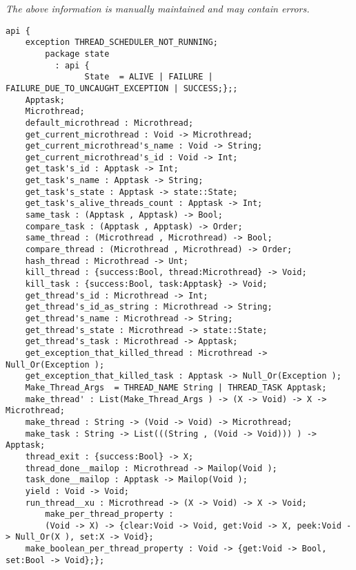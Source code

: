 \label{api:Microthread}

{\tiny \it The above information is manually maintained and may contain errors.}
\begin{verbatim}
api {
    exception THREAD_SCHEDULER_NOT_RUNNING;
        package state
          : api {
                State  = ALIVE | FAILURE | FAILURE_DUE_TO_UNCAUGHT_EXCEPTION | SUCCESS;};;
    Apptask;
    Microthread;
    default_microthread : Microthread;
    get_current_microthread : Void -> Microthread;
    get_current_microthread's_name : Void -> String;
    get_current_microthread's_id : Void -> Int;
    get_task's_id : Apptask -> Int;
    get_task's_name : Apptask -> String;
    get_task's_state : Apptask -> state::State;
    get_task's_alive_threads_count : Apptask -> Int;
    same_task : (Apptask , Apptask) -> Bool;
    compare_task : (Apptask , Apptask) -> Order;
    same_thread : (Microthread , Microthread) -> Bool;
    compare_thread : (Microthread , Microthread) -> Order;
    hash_thread : Microthread -> Unt;
    kill_thread : {success:Bool, thread:Microthread} -> Void;
    kill_task : {success:Bool, task:Apptask} -> Void;
    get_thread's_id : Microthread -> Int;
    get_thread's_id_as_string : Microthread -> String;
    get_thread's_name : Microthread -> String;
    get_thread's_state : Microthread -> state::State;
    get_thread's_task : Microthread -> Apptask;
    get_exception_that_killed_thread : Microthread -> Null_Or(Exception );
    get_exception_that_killed_task : Apptask -> Null_Or(Exception );
    Make_Thread_Args  = THREAD_NAME String | THREAD_TASK Apptask;
    make_thread' : List(Make_Thread_Args ) -> (X -> Void) -> X -> Microthread;
    make_thread : String -> (Void -> Void) -> Microthread;
    make_task : String -> List(((String , (Void -> Void))) ) -> Apptask;
    thread_exit : {success:Bool} -> X;
    thread_done__mailop : Microthread -> Mailop(Void );
    task_done__mailop : Apptask -> Mailop(Void );
    yield : Void -> Void;
    run_thread__xu : Microthread -> (X -> Void) -> X -> Void;
        make_per_thread_property :
        (Void -> X) -> {clear:Void -> Void, get:Void -> X, peek:Void -> Null_Or(X ), set:X -> Void};
    make_boolean_per_thread_property : Void -> {get:Void -> Bool, set:Bool -> Void};};
\end{verbatim}
